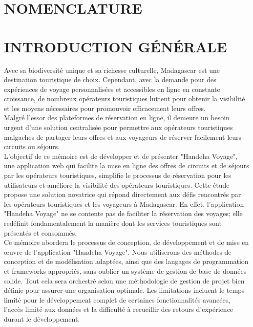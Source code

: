 \documentclass[12pt]{report}
\begin{document}
			\chapter*{NOMENCLATURE}
			\newpage
			\listoftables
			\newpage
			\listoffigures
			\newpage
			\newpage
			\setcounter{page}{1}
			\chapter*{INTRODUCTION GÉNÉRALE}
			\begin{center}
				\begin{minipage}{\textwidth}
					\hspace{15pt} Avec sa biodiversité unique et sa richesse culturelle, Madagascar est une destination touristique de choix. Cependant, avec la demande pour des expériences de voyage personnalisées et accessibles en ligne en constante croissance, de nombreux opérateurs touristiques luttent pour obtenir la visibilité et les moyens nécessaires pour promouvoir efficacement leurs offres.\\
	
					\hspace{15pt} Malgré l'essor des plateformes de réservation en ligne, il demeure un besoin urgent d'une solution centralisée pour permettre aux opérateurs touristiques malgaches de partager leurs offres et aux voyageurs de réserver facilement leurs circuits ou séjours.\\
	
					\hspace{15pt} L'objectif de ce mémoire est de développer et de présenter "Handeha Voyage", une application web qui  facilite la mise en ligne des offres de circuits et de séjours par les opérateurs touristiques, simplifie le processus de réservation pour les utilisateurs et améliore la visibilité des opérateurs touristiques. Cette étude propose une solution novatrice qui répond directement aux défis rencontrés par les opérateurs touristiques et les voyageurs à Madagascar. En effet, l'application "Handeha Voyage" ne se contente pas de faciliter la réservation des voyages; elle redéfinit fondamentalement la manière dont les services touristiques sont présentés et consommés.\\
	
					\hspace{15pt} Ce mémoire abordera le processus de conception, de développement et de mise en œuvre de l'application "Handeha Voyage". Nous utiliserons des méthodes de conception et de modélisation adaptées, ainsi que des langages de programmation et frameworks appropriés, sans oublier un système de gestion de base de données solide. Tout cela sera orchestré selon une méthodologie de gestion de projet bien définie pour assurer une organisation optimale. Les limitations incluent le temps limité pour le développement complet de certaines fonctionnalités avancées, l'accès limité aux données et la difficulté à recueillir des retours d'expérience durant le développement.\\
	

\end{minipage}
\end{center}
\end{document}
